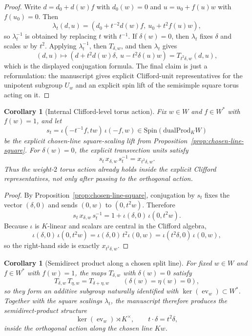 \documentclass{birkjour}
\theoremstyle{plain}
\newtheorem{corollary}[theorem]{Corollary}
\theoremstyle{definition}
\theoremstyle{remark}
\newcommand{\Spin}{\mathrm{Spin}}
\newcommand{\dualProd}{\mathrm{dualProd}}
\begin{document}
\begin{proof}
Write $d=d_0+d(w)f$ with $d_0(w)=0$ and $u=u_0+f(u)w$ with $f(u_0)=0$. Then
\[
  \lambda_t(d,u)=(d_0+t^{-2}d(w)f,\ u_0+t^2f(u)w),
\]
so $\lambda_t^{-1}$ is obtained by replacing $t$ with $t^{-1}$. If
$\delta(w)=0$, then $\lambda_t$ fixes $\delta$ and scales $w$ by $t^2$. Applying
$\lambda_t^{-1}$, then $T_{\delta,w}$, and then $\lambda_t$ gives
\[
  (d,u)\longmapsto (d+t^2d(w)\delta,\ u-t^2\delta(u)w)
  = T_{t^2\delta,w}(d,u),
\]
which is the displayed conjugation formula. The final claim is just a
reformulation: the manuscript gives explicit Clifford-unit representatives for
the unipotent subgroup $U_w$ and an explicit spin lift of the semisimple square
torus acting on it.
\end{proof}

\begin{corollary}[Internal Clifford-level torus action]
\label{cor:internal-clifford-torus}
Fix $w\in W$ and $f\in W^*$ with $f(w)=1$, and let
\[
  s_t = \iota(-t^{-1}f,tw)\,\iota(-f,w)\in \Spin(\dualProd_K W)
\]
be the explicit chosen-line square-scaling lift from
Proposition~{}\ref{prop:chosen-line-square}. For $\delta(w)=0$, the explicit
transvection units satisfy
\[
  s_t\,x_{\delta,w}\,s_t^{-1}=x_{t^2\delta,w}.
\]
Thus the weight-$2$ torus action already holds inside the explicit Clifford
representatives, not only after passing to the orthogonal action.
\end{corollary}

\begin{proof}
By Proposition~{}\ref{prop:chosen-line-square}, conjugation by $s_t$ fixes the
vector $(\delta,0)$ and sends $(0,w)$ to $(0,t^2w)$. Therefore
\[
  s_t\,x_{\delta,w}\,s_t^{-1}
  = 1 + \iota(\delta,0)\,\iota(0,t^2w).
\]
Because $\iota$ is $K$-linear and scalars are central in the Clifford algebra,
\[
  \iota(\delta,0)\,\iota(0,t^2w)
  = \iota(\delta,0)\,t^2\iota(0,w)
  = \iota(t^2\delta,0)\,\iota(0,w),
\]
so the right-hand side is exactly $x_{t^2\delta,w}$.
\end{proof}

\begin{corollary}[Semidirect product along a chosen split line]
\label{cor:one-line-semidirect}
For fixed $w\in W$ and $f\in W^*$ with $f(w)=1$, the maps $T_{\delta,w}$ with
$\delta(w)=0$ satisfy
\[
  T_{\delta,w}\,T_{\eta,w}=T_{\delta+\eta,w}
  \qquad
  (\delta(w)=\eta(w)=0),
\]
so they form an additive subgroup naturally identified with
$\ker(\operatorname{ev}_w)\subset W^*$. Together with the square scalings
$\lambda_t$, the manuscript therefore produces the semidirect-product structure
\[
  \ker(\operatorname{ev}_w)\rtimes K^\times,
  \qquad
  t\cdot \delta = t^2\delta,
\]
inside the orthogonal action along the chosen line $Kw$.
\end{corollary}
\end{document}
